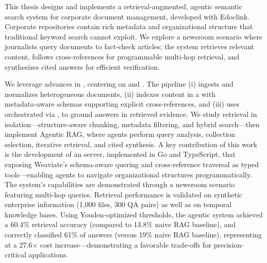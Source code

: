 \glsresetall
\noindent  
This thesis designs and implements a retrieval‑augmented, agentic semantic search system for corporate document management, developed with Edoclink. Corporate repositories contain rich metadata and organizational structure that traditional keyword search cannot exploit. We explore a newsroom scenario where journalists query documents to fact‑check articles; the system retrieves relevant content, follows cross‑references for programmable multi‑hop retrieval, and synthesizes cited answers for efficient verification.

We leverage advances in , centering on  and . The pipeline (i) ingests and normalizes heterogeneous documents, (ii) indexes content in a  with metadata‑aware schemas supporting explicit cross-references, and (iii) uses  orchestrated via , to ground answers in retrieved evidence. We study retrieval in isolation—structure‑aware chunking, metadata filtering, and hybrid search—then implement Agentic RAG, where agents perform query analysis, collection selection, iterative retrieval, and cited synthesis.
A key contribution of this work is the development of an  server, implemented in Go and TypeScript, that exposing Weaviate's schema-aware quering and cross-reference traversal as typed tools—enabling agents to navigate organizational structures programmatically. The system's capabilities are demonstrated through a newsroom scenario featuring multi-hop queries. Retrieval performance is validated on synthetic enterprise information (1,000 files, 300 QA pairs) as well as on temporal knowledge bases. Using Youden-optimized thresholds, the agentic system achieved a 60.4\% retrieval accuracy (compared to 13.8\% naive \gls{RAG} baseline), and correctly classified 61\% of answers (versus 19\% naive \gls{RAG} baseline), representing at a 27.6× cost increase—demonstrating a favorable trade-offs for precision-critical applications.